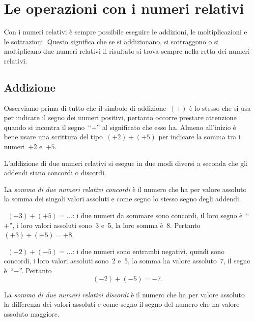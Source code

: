 \section{Le operazioni con i numeri relativi}

Con i numeri relativi è sempre possibile eseguire le addizioni, le moltiplicazioni e le sottrazioni.
Questo significa che se si addizionano, si sottraggono o si moltiplicano due numeri relativi il risultato si
trova sempre nella retta dei numeri relativi.

\subsection{Addizione}

Osserviamo prima di tutto che il simbolo di addizione~$(+)$ è lo stesso che si usa per indicare il segno dei numeri
positivi, pertanto occorre prestare attenzione quando si incontra il segno~``$+$'' al significato che esso ha.
Almeno all'inizio è bene usare una scrittura del tipo~$(+2)+(+5)$ per indicare la somma tra i numeri~$+2$ e~$+5$.

L'addizione di due numeri relativi si esegue in due modi diversi a seconda che gli addendi siano concordi o discordi.

La \emph{somma di due numeri relativi concordi} è il numero che ha per valore assoluto la somma dei singoli valori assoluti e
come segno lo stesso segno degli addendi.
\pagebreak
\begin{exrig}
 \begin{esempio}
~$(+3)+(+5)=\ldots$: i due numeri da sommare sono concordi, il loro segno è~``$+$'', i loro valori assoluti sono~3 e~5,
la loro somma è~8. Pertanto~$(+3)+(+5)=+8$.
 \end{esempio}

 \begin{esempio}
~$(-2)+(-5)=\ldots$: i due numeri sono entrambi negativi, quindi sono concordi, i loro valori assoluti sono~2 e~5,
la somma ha valore assoluto~7, il segno è~``$-$''. Pertanto
\[(-2)+(-5)=-7.\]
 \end{esempio}

\end{exrig}
	
La \emph{somma di due numeri relativi discordi} è il numero che ha per valore assoluto la differenza dei valori assoluti
e come segno il segno del numero che ha valore assoluto maggiore.

